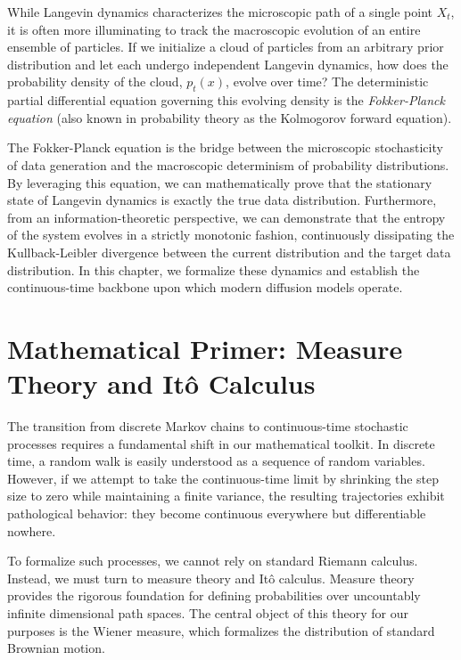 While Langevin dynamics characterizes the microscopic path of a single point $X_t$, it is often more illuminating to track the macroscopic evolution of an entire ensemble of particles. If we initialize a cloud of particles from an arbitrary prior distribution and let each undergo independent Langevin dynamics, how does the probability density of the cloud, $p_t(x)$, evolve over time? The deterministic partial differential equation governing this evolving density is the \emph{Fokker-Planck equation} (also known in probability theory as the Kolmogorov forward equation). 

The Fokker-Planck equation is the bridge between the microscopic stochasticity of data generation and the macroscopic determinism of probability distributions. By leveraging this equation, we can mathematically prove that the stationary state of Langevin dynamics is exactly the true data distribution. Furthermore, from an information-theoretic perspective, we can demonstrate that the entropy of the system evolves in a strictly monotonic fashion, continuously dissipating the Kullback-Leibler divergence between the current distribution and the target data distribution. In this chapter, we formalize these dynamics and establish the continuous-time backbone upon which modern diffusion models operate.

\section{Mathematical Primer: Measure Theory and It\^o Calculus}

The transition from discrete Markov chains to continuous-time stochastic processes requires a fundamental shift in our mathematical toolkit. In discrete time, a random walk is easily understood as a sequence of random variables. However, if we attempt to take the continuous-time limit by shrinking the step size to zero while maintaining a finite variance, the resulting trajectories exhibit pathological behavior: they become continuous everywhere but differentiable nowhere. 

To formalize such processes, we cannot rely on standard Riemann calculus. Instead, we must turn to measure theory and It\^o calculus. Measure theory provides the rigorous foundation for defining probabilities over uncountably infinite dimensional path spaces. The central object of this theory for our purposes is the Wiener measure, which formalizes the distribution of standard Brownian motion.

